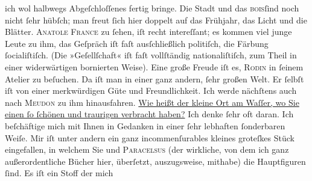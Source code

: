 \begin{ledgroupsized}[t]{13cm}
               ich wol halbwegs Abgeſchloſſenes fertig bringe.\pend
           \pstart
           Die Stadt und das \textsc{bois}ſind noch nicht ſehr hübſch; man freut ſich hier
               doppelt auf das Frühjahr, das Licht und die Blätter.\pend
           \pstart
           \textsc{Anatole France} zu ſehen, iſt recht intereſſant; es kommen {\pb}viel junge Leute zu ihm, das
               Geſpräch iſt faſt ausſchließlich politiſch, die Färbung ſocialiſtiſch. (Die
               »Geſellſchaft« iſt faſt vollſtändig nationaliſtiſch, zum Theil in einer widerwärtigen
               bornierten Weise).\pend
           \pstart
           Eine große Freude iſt es, \textsc{Rodin} in ſeinem Atelier zu beſuchen. Da iſt man in einer ganz andern, ſehr großen
               Welt. Er ſelbſt iſt von einer merkwürdigen Güte und Freundlichkeit. Ich {\pb}werde  nächſtens auch nach \textsc{Meudon} zu ihm hinausfahren.\pend
           \pstart
           \uline{Wie heißt der kleine Ort am Waſſer, wo Sie einen ſo ſchönen und traurigen
                     \label{K_L01021_1v}\label{K_L01021_1h} verbracht haben?} Ich denke ſehr oft daran.\pend
           \pstart
           Ich beſchäftige mich mit Ihnen in Gedanken in einer ſehr lebhaften ſonderbaren Weiſe.
               Mir iſt unter andern ein ganz incommenſurables kleines groteſkes Stück eingefallen, in welchem Sie und \textsc{Paracelsus} (der wirkliche, von dem ich ganz {\pb}außerordentliche Bücher hier,
               überſetzt, auszugsweise, mithabe) die Hauptfiguren ſind. Es iſt ein Stoff der mich

\end{ledgroupsized}
